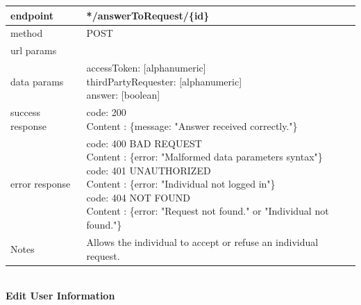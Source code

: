 \begin{legal}
\begin{legal}
\begin{itemize}
								\begin{tabularx}{\linewidth}{| l | l |}
									\hline
									endpoint & */answerToRequest/\{id\} \\
									\hline
									method & POST \\
									\hline
									url params & \\
									\hline
									data params &
									\parbox{0.7\textwidth}{
										\bigskip
										accessToken: [alphanumeric]\\
										thirdPartyRequester: [alphanumeric]\\
										answer: [boolean]
										\bigskip
									} \\
									\hline
									success response &
									\parbox{0.7\textwidth}{
										\bigskip
										code: 200\\
										Content : \{message: "Answer received correctly."\}
										\bigskip
									} \\
									\hline
									error response &
									\parbox{0.7\textwidth}{
										\bigskip
										code: 400 BAD REQUEST \\
										Content : \{error: "Malformed data parameters syntax"\}\\
										code: 401 UNAUTHORIZED \\
										Content : \{error: "Individual not logged in"\}\\
										code: 404 NOT FOUND \\
										Content : \{error: "Request not found." or "Individual not found."\}
										\bigskip
									} \\
									\hline
									Notes & 
									\parbox{0.7\textwidth}{
										\bigskip Allows the individual to accept or refuse an individual request.
									\bigskip}  \\
									\hline
								\end{tabularx}\\
								
								\textbf{Edit User Information} \\


\end{itemize}
\end{legal}
\end{legal}
